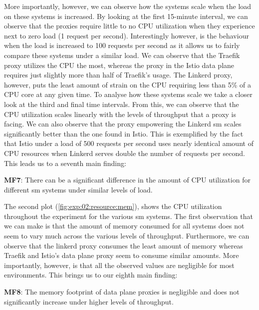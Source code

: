 More importantly, however, we can observe how the systems scale when the load on these systems is increased. By looking at the first 15-minute interval, we can observe that the proxies require little to no CPU utilization when they experience next to zero load (1 request per second). Interestingly however, is the behaviour when the load is increased to 100 requests per second as it allows us to fairly compare these systems under a similar load. We can observe that the Traefik proxy utilizes the CPU the most, whereas the proxy in the Istio data plane requires just slightly more than half of Traefik's usage. The Linkerd proxy, however, puts the least amount of strain on the CPU requiring less than 5\% of a CPU core at any given time. To analyse how these systems scale we take a closer look at the third and final time intervals. From this, we can observe that the CPU utilization scales linearly with the levels of throughput that a proxy is facing. We can also observe that the proxy empowering the Linkerd \gls{sm} scales significantly better than the one found in Istio. This is exemplified by the fact that Istio under a load of 500 requests per second uses nearly identical amount of CPU resources when Linkerd serves double the number of requests per second. This leads us to a seventh main finding:

\begin{shaded*}
    \noindent
    \textbf{MF7}: 
    There can be a significant difference in the amount of CPU utilization for different \gls{sm} systems under similar levels of load.
\end{shaded*}

The second plot (\cref{fig:exp:02:resource:mem}), shows the CPU utilization throughout the experiment for the various \gls{sm} systems. The first observation that we can make is that the amount of memory consumed for all systems does not seem to vary much across the various levels of throughput. Furthermore, we can observe that the linkerd proxy consumes the least amount of memory whereas Traefik and Istio's data plane proxy seem to consume similar amounts. More importantly, however, is that all the observed values are negligible for most environments. This brings us to our eighth main finding:

\begin{shaded*}
    \noindent
    \textbf{MF8}: 
    The memory footprint of data plane proxies is negligible and does not significantly increase under higher levels of throughput.
\end{shaded*}
